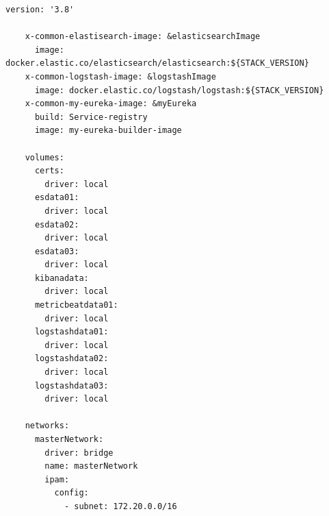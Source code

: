 \begin{lstlisting}[caption=Plik docker-comose.yml, label=dockerComposeFile]
    version: '3.8'
    
    x-common-elastisearch-image: &elasticsearchImage
      image: docker.elastic.co/elasticsearch/elasticsearch:${STACK_VERSION}
    x-common-logstash-image: &logstashImage
      image: docker.elastic.co/logstash/logstash:${STACK_VERSION}
    x-common-my-eureka-image: &myEureka
      build: Service-registry
      image: my-eureka-builder-image
    
    volumes:
      certs:
        driver: local
      esdata01:
        driver: local
      esdata02:
        driver: local
      esdata03:
        driver: local
      kibanadata:
        driver: local
      metricbeatdata01:
        driver: local
      logstashdata01:
        driver: local
      logstashdata02:
        driver: local
      logstashdata03:
        driver: local
    
    networks:
      masterNetwork:
        driver: bridge
        name: masterNetwork
        ipam:
          config:
            - subnet: 172.20.0.0/16
    

\end{lstlisting}
